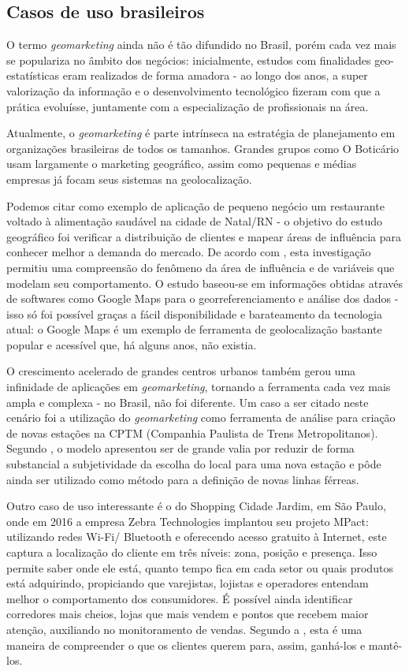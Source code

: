 \subsection{Casos de uso brasileiros}

O termo \emph{geomarketing} ainda não é tão difundido no Brasil, porém cada
vez mais se populariza no âmbito dos negócios: inicialmente, estudos com finalidades geo-estatísticas eram realizados de forma amadora - ao longo dos anos, a super valorização da informação e o desenvolvimento tecnológico fizeram com que a prática evoluísse, juntamente com a especialização de profissionais na área.

Atualmente, o \emph{geomarketing} é parte intrínseca na estratégia de planejamento em organizações brasileiras de todos os tamanhos. Grandes grupos como O Boticário usam largamente o marketing geográfico, assim como pequenas e médias empresas já focam seus sistemas na geolocalização.

Podemos citar como exemplo de aplicação de pequeno negócio um restaurante voltado à alimentação saudável na cidade de Natal/RN - o objetivo do estudo geográfico foi verificar a distribuição de clientes e
mapear áreas de influência para conhecer melhor a demanda do mercado. De acordo
com , esta investigação permitiu uma compreensão do
fenômeno da área de influência e de variáveis que modelam seu comportamento. O
estudo baseou-se em informações obtidas através de softwares como Google
Maps para o georreferenciamento e análise dos dados - isso só foi possível
graças a fácil disponibilidade e barateamento da tecnologia atual: o
Google Maps é um exemplo de ferramenta de geolocalização bastante popular
e acessível que, há alguns anos, não existia.

O crescimento acelerado de grandes centros urbanos também gerou uma infinidade de aplicações em \emph{geomarketing}, tornando a ferramenta cada vez mais ampla e
complexa - no Brasil, não foi diferente. Um caso a ser citado neste cenário foi a utilização do
\emph{geomarketing} como ferramenta de análise para criação de novas estações na
CPTM (Companhia Paulista de Trens Metropolitanos). Segundo
, o modelo apresentou ser de grande valia por reduzir de
forma substancial a subjetividade da escolha do local para uma nova estação e
pôde ainda ser utilizado como método para a definição de novas linhas férreas.

Outro caso de uso interessante é o do Shopping Cidade Jardim, em São Paulo, onde em 2016 a empresa Zebra Technologies implantou seu projeto MPact: utilizando redes Wi-Fi/ Bluetooth e oferecendo acesso gratuito à Internet, este captura a localização do cliente em três níveis: zona, posição e presença. Isso permite saber onde ele está, quanto tempo fica em cada setor ou quais produtos está adquirindo, propiciando que varejistas, lojistas e operadores entendam melhor o comportamento dos consumidores. É possível ainda identificar corredores mais cheios, lojas que mais vendem e pontos que recebem maior atenção, auxiliando no monitoramento de vendas. Segundo a , esta é uma maneira de compreender o que os clientes querem para, assim, ganhá-los e mantê-los.

